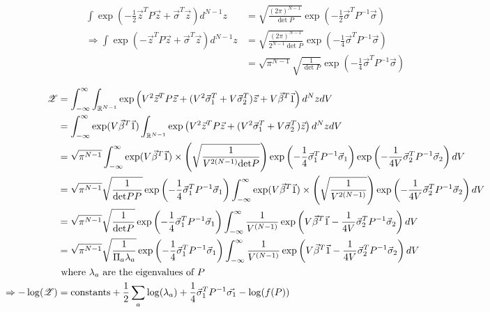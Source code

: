 \documentclass{article}
\newcommand{\z}{\mathscr{Z}}
\begin{document}
\begin{fact}
\begin{align*}
\int\exp\left(-\frac{1}{2}\vec{z}^TP\vec{z}+\vec{\sigma}^T\vec{z}\right)d^{N-1}z&=\sqrt{\frac{(2\pi)^{N-1}}{\det P}}\exp\left(-\frac{1}{2}\vec{\sigma}^TP^{-1}\vec{\sigma}\right)
\\\Rightarrow \int\exp\left(-\vec{z}^TP\vec{z}+\vec{\sigma}^T\vec{z}\right)d^{N-1}z&=\sqrt{\frac{(2\pi)^{N-1}}{2^{N-1}\det P}}\exp\left(-\frac{1}{4}\vec{\sigma}^TP^{-1}\vec{\sigma}\right)
\\&=\sqrt{\pi^{N-1}}\sqrt{\frac{1}{\det P}}\exp\left(-\frac{1}{4}\vec{\sigma}^TP^{-1}\vec{\sigma}\right)
\end{align*}
\end{fact}

\begin{align*}
\z&=\int_{-\infty}^\infty\int_{\R^{N-1}}\exp\left(V^2\vec{z}^TP\vec{z}+(V^2\vec{\sigma}_1^T+V\vec{\sigma}_2^T)\vec{z}+V\vec{\beta}^T\vec{1}\right)d^NzdV
\\&=\int_{-\infty}^\infty \exp(V\vec{\beta}^T\vec{1})\int_{\R^{N-1}}\exp\left(V^2\vec{z}^TP\vec{z}+(V^2\vec{\sigma}_1^T+V\vec{\sigma}_2^T)\vec{z}\right)d^NzdV
\\&=\sqrt{\pi^{N-1}}\int_{-\infty}^\infty\exp(V\vec{\beta}^T\vec{1})\times\left(\sqrt{\frac{1}{V^{2(N-1)}\det{P}}}\right)\exp\left(-\frac{1}{4}\vec{\sigma}_1^TP^{-1}\vec{\sigma}_1\right)\exp\left(-\frac{1}{4V}\vec{\sigma}_2^TP^{-1}\vec{\sigma}_2\right)dV
\\&=\sqrt{\pi^{N-1}}\sqrt{\frac{1}{\det PP}}\exp\left(-\frac{1}{4}\vec{\sigma}_1^TP^{-1}\vec{\sigma}_1\right)\int_{-\infty}^\infty\exp(V\vec{\beta}^T\vec{1})\times\left(\sqrt{\frac{1}{V^{2(N-1)}}}\right)\exp\left(-\frac{1}{4V}\vec{\sigma}_2^TP^{-1}\vec{\sigma}_2\right)dV
\\&=\sqrt{\pi^{N-1}}\sqrt{\frac{1}{\det P}}\exp\left(-\frac{1}{4}\vec{\sigma}_1^TP^{-1}\vec{\sigma}_1\right)\int_{-\infty}^\infty\frac{1}{V^{(N-1)}}\exp\left(V\vec{\beta}^T\vec{1}-\frac{1}{4V}\vec{\sigma}_2^TP^{-1}\vec{\sigma}_2\right)dV
\\&=\sqrt{\pi^{N-1}}\sqrt{\frac{1}{\Pi_a\lambda_a}}\exp\left(-\frac{1}{4}\vec{\sigma}_1^TP^{-1}\vec{\sigma}_1\right)\int_{-\infty}^\infty\frac{1}{V^{(N-1)}}\exp\left(V\vec{\beta}^T\vec{1}-\frac{1}{4V}\vec{\sigma}_2^TP^{-1}\vec{\sigma}_2\right)dV 
\\&\text{ where $\lambda_a$ are the eigenvalues of $P$}
\\ \Rightarrow -\log(\z)&=\text{constants}+\frac{1}{2}\sum_a\log(\lambda_a)+\frac{1}{4}\vec{\sigma}_1^TP^{-1}\vec{\sigma_1}-\log(f(P))
\end{align*}
\end{document}
